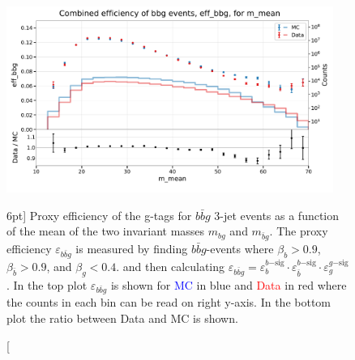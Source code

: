\documentclass[a4paper, twoside]{tufte-book}
\begin{document}
\begin{figure}
  \includegraphics[width=0.95\textwidth, trim=0 0 0 40, clip]{figures/quarks/eff_bbg_m_mean-down_sample=1.00-ML_vars=vertex-selection=b-ejet_min=4-n_iter_RS_lgb=99-n_iter_RS_xgb=9-cdot_cut=0.90-version=19.pdf}
  \caption[g-Tagging proxy efficiency for $b\bar{b}g$-events as function of the mean invariant mass][6pt]
          {Proxy efficiency of the g-tags for $b\bar{b}g$ 3-jet events as a function of the mean of the two invariant masses $m_{bg}$ and $m_{\bar{b}g}$. The proxy efficiency $\varepsilon_{b\bar{b}g}$ is measured by finding $b\bar{b}g$-events where $\beta_b > 0.9$, $\beta_{\bar{b}}>0.9$, and $\beta_g < 0.4$. and then calculating  $\varepsilon_{b\bar{b}g} = \varepsilon_b^{b\mathrm{-sig}} \cdot \varepsilon_{\bar{b}}^{b\mathrm{-sig}} \cdot  \varepsilon_g^{g\mathrm{-sig}} $. In the top plot $\varepsilon_{b\bar{b}g}$ is shown for \textcolor{blue}{MC} in blue and \textcolor{red}{Data} in red where the counts in each bin can be read on right y-axis. In the bottom plot the ratio between Data and MC is shown.
          } 
  \label{fig:q:effiency_btag_bbg_m_mean}
\end{figure}
\end{document}
